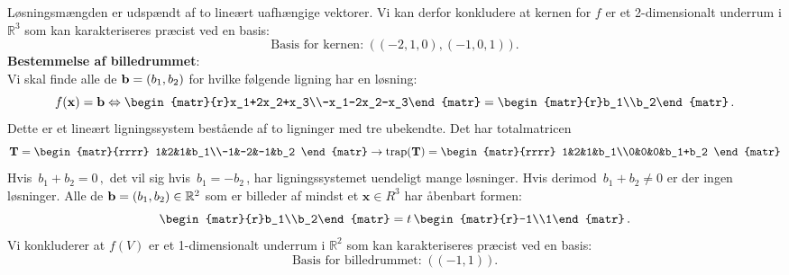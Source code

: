 \begin{example}
Løsningsmængden er udspændt af to lineært uafhængige vektorer. Vi kan derfor konkludere at kernen for $f$ er et 2-dimensionalt underrum i $\mathbb R^3$ som kan karakteriseres præcist ved en basis:
$$\mathrm{Basis\,\,for\,\,kernen:\,\,} \big(\,(-2,1,0),(-1,0,1)\,\big)\,.$$
\textbf{Bestemmelse af billedrummet}:\\
Vi skal finde alle de $\mathbf{b}=(b_1,b_2)$ for hvilke følgende ligning har en løsning:
\begin{equation}\label{tn8.exKerneb}
f(\mathbf x)=\mb\Leftrightarrow \begin{matr}{r}x_1+2x_2+x_3\\-x_1-2x_2-x_3\end{matr}
=\begin{matr}{r}b_1\\b_2\end{matr}\,.
\end{equation}
Dette er et lineært ligningssystem bestående af to ligninger med tre ubekendte. Det har totalmatricen
$$
\mT=
\begin{matr}{rrrr}
1&2&1&b_1\\-1&-2&-1&b_2 \end{matr}
\rightarrow \mathrm{trap}(\mT)=
\begin{matr}{rrrr}
1&2&1&b_1\\0&0&0&b_1+b_2 \end{matr}
$$
Hvis $\,b_1+b_2=0\,,$ det vil sig hvis $\,b_1=-b_2\,$, har ligningssystemet uendeligt mange løsninger. Hvis derimod $\,b_1+b_2\neq 0$ er der ingen løsninger. Alle de $\mathbf{b}=(b_1,b_2)\in \mathbb R^2$ som er billeder af mindst et $\mathbf x \in  R^3$ har åbenbart formen:
$$
\begin{matr}{r}b_1\\b_2\end{matr}=t\,\begin{matr}{r}-1\\1\end{matr}\,.$$
Vi konkluderer at $f(V)$ er et 1-dimensionalt underrum i $\mathbb R^2$ som kan karakteriseres præcist ved en basis:
$$\mathrm{Basis\,\,for\,\,billedrummet:\,\,}\big(\,(-1,1)\,\big)\,.$$
\end{example}

